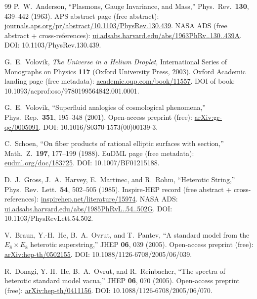 ﻿\documentclass[reprint,amsmath,amssymb,aps,prd,longbibliography,floatfix]{revtex4-2}
\begin{document}
\begin{thebibliography}{99}
 P.~W.~Anderson,
``Plasmons, Gauge Invariance, and Mass,''
Phys.\ Rev.\ \textbf{130}, 439--442 (1963).
APS abstract page (free abstract):
\href{https://journals.aps.org/pr/abstract/10.1103/PhysRev.130.439}{journals.aps.org/pr/abstract/10.1103/PhysRev.130.439}.
NASA ADS (free abstract + cross-references):
\href{https://ui.adsabs.harvard.edu/abs/1963PhRv..130..439A/abstract}{ui.adsabs.harvard.edu/abs/1963PhRv..130..439A}.
DOI: 10.1103/PhysRev.130.439.

 G.~E.~Volovik,
\textit{The Universe in a Helium Droplet},
International Series of Monographs on Physics \textbf{117}
(Oxford University Press, 2003).
Oxford Academic landing page (free metadata):
\href{https://academic.oup.com/book/11557}{academic.oup.com/book/11557}.
DOI of book: 10.1093/acprof:oso/9780199564842.001.0001.

 G.~E.~Volovik,
``Superfluid analogies of cosmological phenomena,''
Phys.\ Rep.\ \textbf{351}, 195--348 (2001).
Open-access preprint (free): \href{https://arxiv.org/abs/gr-qc/0005091}{arXiv:gr-qc/0005091}.
DOI: 10.1016/S0370-1573(00)00139-3.

 C.~Schoen,
``On fiber products of rational elliptic surfaces with section,''
Math.\ Z.\ \textbf{197}, 177--199 (1988).
EuDML page (free metadata):
\href{https://eudml.org/doc/183725}{eudml.org/doc/183725}.
DOI: 10.1007/BF01215188.

 D.~J.~Gross, J.~A.~Harvey, E.~Martinec, and R.~Rohm,
``Heterotic String,''
Phys.\ Rev.\ Lett.\ \textbf{54}, 502--505 (1985).
Inspire-HEP record (free abstract + cross-references):
\href{https://inspirehep.net/literature/15974}{inspirehep.net/literature/15974}.
NASA ADS:
\href{https://ui.adsabs.harvard.edu/abs/1985PhRvL..54..502G/abstract}{ui.adsabs.harvard.edu/abs/1985PhRvL..54..502G}.
DOI: 10.1103/PhysRevLett.54.502.

 V.~Braun, Y.-H.~He, B.~A.~Ovrut, and T.~Pantev,
``A standard model from the $E_8 \times E_8$ heterotic superstring,''
JHEP \textbf{06}, 039 (2005).
Open-access preprint (free): \href{https://arxiv.org/abs/hep-th/0502155}{arXiv:hep-th/0502155}.
DOI: 10.1088/1126-6708/2005/06/039.

 R.~Donagi, Y.-H.~He, B.~A.~Ovrut, and R.~Reinbacher,
``The spectra of heterotic standard model vacua,''
JHEP \textbf{06}, 070 (2005).
Open-access preprint (free): \href{https://arxiv.org/abs/hep-th/0411156}{arXiv:hep-th/0411156}.
DOI: 10.1088/1126-6708/2005/06/070.


\end{thebibliography}
\end{document}
